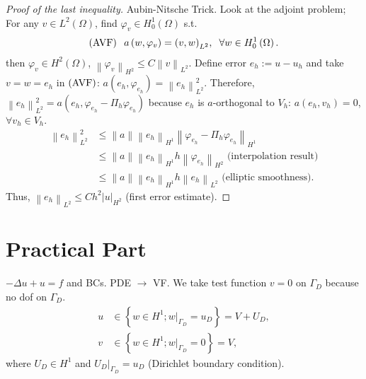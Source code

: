 \documentclass[11pt,a4paper,center,notitlepage]{article}
\numberwithin{equation}{section}
\begin{document}
\begin{proof}[Proof of the last inequality]
Aubin-Nitsche Trick. Look at the adjoint problem; For any $v\in L^2\left(\Omega\right)$, find $\varphi _v\in H_0^1\left(\Omega\right)$ s.t. 
\begin{align}
\left( {\rm AVF} \right) \hspace{2mm} a\left( {w,{\varphi _v}} \right) = {\left( {v,w} \right)_{{L^2}}}, \hspace{2mm} \forall w \in H_0^1\left( \Omega  \right).
\end{align}
then $\varphi _v\in H^2\left(\Omega\right)$, ${\left\| {{\varphi _v}} \right\|_{{H^2}}} \le C{\left\| v \right\|_{{L^2}}}$. Define error $e_h:=u-u_h$ and take $v=w=e_h$ in $\left({\rm AVF}\right)$: $a\left( {{e_h},{\varphi _{{e_h}}}} \right) = \left\| {{e_h}} \right\|_{{L^2}}^2$. Therefore, $\left\| {{e_h}} \right\|_{{L^2}}^2 = a\left( {{e_h},{\varphi _{{e_h}}} - {\Pi _h}{\varphi _{{e_h}}}} \right)$ because $e_h$ is $a$-orthogonal to $V_h$: $a\left(e_h,v_h\right)=0$, $\forall v_h\in V_h$.
\begin{align}
\left\| {{e_h}} \right\|_{{L^2}}^2 &\le \left\| a \right\|{\left\| {{e_h}} \right\|_{{H^1}}}{\left\| {{\varphi _{{e_h}}} - {\Pi _h}{\varphi _{{e_h}}}} \right\|_{{H^1}}}\\
& \le \left\| a \right\|{\left\| {{e_h}} \right\|_{{H^1}}}h{\left\| {{\varphi _{{e_h}}}} \right\|_{{H^2}}} \mbox{ (interpolation result)}\\
& \le \left\| a \right\|{\left\| {{e_h}} \right\|_{{H^1}}}h{\left\| {{e_h}} \right\|_{{L^2}}}\mbox{ (elliptic smoothness)}.
\end{align}
Thus, ${\left\| {{e_h}} \right\|_{{L^2}}} \le C{h^2}{\left| u \right|_{{H^2}}}$ (first error estimate). 
\end{proof}

\section{Practical Part}
$-\Delta u +u=f$ and BCs. PDE $\to$ VF. We take test function $v=0$ on $\Gamma _D$ because no dof on $\Gamma _D$.
\begin{align}
u &\in \left\{ {w \in {H^1};{{\left. w \right|}_{{\Gamma _D}}} = {u_D}} \right\} = V + {U_D},\\
v &\in \left\{ {w \in {H^1};{{\left. w \right|}_{{\Gamma _D}}} = 0} \right\} = V,
\end{align}
where $U_D\in H^1$ and ${\left. {{U_D}} \right|_{{\Gamma _D}}} = {u_D}$ (Dirichlet boundary condition). 
\end{document}
